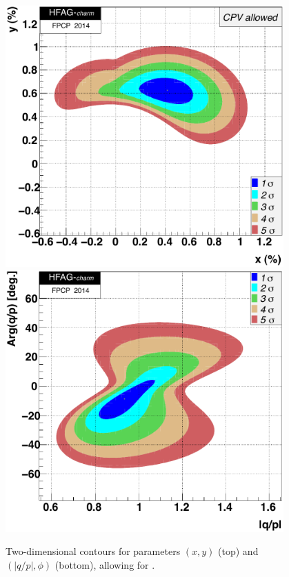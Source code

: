\begin{figure}
\begin{center}
\vbox{
\includegraphics[width=4.2in]{figures/charm/fig_plot_xy2d}
\vskip0.10in
\includegraphics[width=4.2in]{figures/charm/fig_plot_qp2d}
}
\end{center}
\vskip-0.10in
\caption{\label{fig:contours_cpv}
Two-dimensional contours for parameters $(x,y)$ (top) 
and $(|q/p|,\phi)$ (bottom), allowing for \cpv.}
\end{figure}


